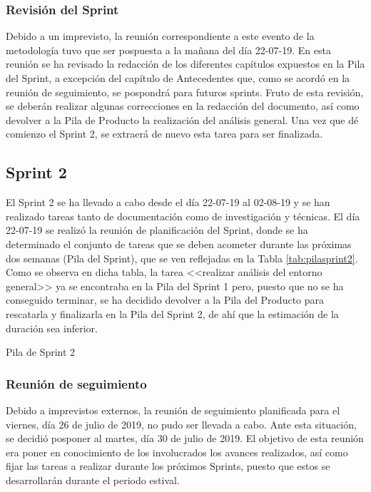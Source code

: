 \subsubsection{Revisión del Sprint}
Debido a un imprevisto, la reunión correspondiente a este evento de la metodología tuvo que ser pospuesta a la mañana del día 22-07-19. En esta reunión se ha revisado la redacción de los diferentes capítulos expuestos en la Pila del Sprint, a excepción del capítulo de Antecedentes que, como se acordó en la reunión de seguimiento, se pospondrá para futuros sprints. Fruto de esta revisión, se deberán realizar algunas correcciones en la redacción del documento, así como devolver a la Pila de Producto la realización del análisis general. Una vez que dé comienzo el Sprint 2, se extraerá de nuevo esta tarea para ser finalizada.

\clearpage

\subsection{Sprint 2}
El Sprint 2 se ha llevado a cabo desde el día 22-07-19 al 02-08-19 y se han realizado tareas tanto de documentación como de investigación y técnicas. El día 22-07-19 se realizó la reunión de planificación del Sprint, donde se ha determinado el conjunto de tareas que se deben acometer durante las próximas dos semanas (Pila del Sprint), que se ven reflejadas en la Tabla \ref{tab:pilasprint2}. Como se observa en dicha tabla, la tarea <<realizar análisis del entorno general>> ya se encontraba en la Pila del Sprint 1 pero, puesto que no se ha conseguido terminar, se ha decidido devolver a la Pila del Producto para rescatarla y finalizarla en la Pila del Sprint 2, de ahí que la estimación de la duración sea inferior.

\begin{table}[!htbp]
	\centering
	{\small
		
	}
	\caption[Pila de Sprint 2]
	{Pila de Sprint 2}
	\label{tab:pilasprint2}
\end{table}

\subsubsection{Reunión de seguimiento}
Debido a imprevistos externos, la reunión de seguimiento planificada para el viernes, día 26 de julio de 2019, no pudo ser llevada a cabo. Ante esta situación, se decidió posponer al martes, día 30 de julio de 2019. El objetivo de esta reunión era poner en conocimiento de los involucrados los avances realizados, así como fijar las tareas a realizar durante los próximos Sprints, puesto que estos se desarrollarán durante el periodo estival.

